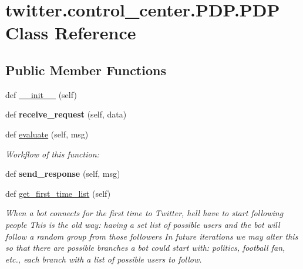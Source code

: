 \hypertarget{classtwitter_1_1control__center_1_1PDP_1_1PDP}{}\section{twitter.\+control\+\_\+center.\+P\+D\+P.\+P\+DP Class Reference}
\label{classtwitter_1_1control__center_1_1PDP_1_1PDP}
\subsection*{Public Member Functions}
\begin{DoxyCompactItemize}
\item 
def \hyperlink{classtwitter_1_1control__center_1_1PDP_1_1PDP_adf406e4b2ad47c65c563ccc7eccaf871}{\+\_\+\+\_\+init\+\_\+\+\_\+} (self)
\item 
\mbox{\label{classtwitter_1_1control__center_1_1PDP_1_1PDP_af72d3a9d5544d71cf6d96369e79d0d37}} 
def {\bfseries receive\+\_\+request} (self, data)
\item 
def \hyperlink{classtwitter_1_1control__center_1_1PDP_1_1PDP_ad40264a760a1bdcb7563cb71955bb7f9}{evaluate} (self, msg)
\begin{DoxyCompactList}\small\item\em Workflow of this function\+: \end{DoxyCompactList}\item 
\mbox{\label{classtwitter_1_1control__center_1_1PDP_1_1PDP_ae0c0a77717da7489004c0b34b9fec771}} 
def {\bfseries send\+\_\+response} (self, msg)
\item 
def \hyperlink{classtwitter_1_1control__center_1_1PDP_1_1PDP_a5ac3bf5edb6f1913f09aecf0fe1ccc7f}{get\+\_\+first\+\_\+time\+\_\+list} (self)
\begin{DoxyCompactList}\small\item\em When a bot connects for the first time to Twitter, he\textquotesingle{}ll have to start following people This is the old way\+: having a set list of possible users and the bot will follow a random group from those followers In future iterations we may alter this so that there are possible branches a bot could start with\+: politics, football fan, etc., each branch with a list of possible users to follow. \end{DoxyCompactList}\item 

\end{DoxyCompactItemize}
